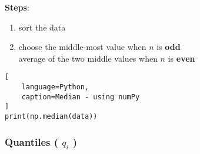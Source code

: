 \vspace{0.3cm}
\textbf{Steps}: \hfill \cite{statistics/book/Statistics-for-Data-Scientists/Maurits-Kaptein}
\begin{enumerate}
    \item sort the data

    \item choose the middle-most value when $n$ is \textbf{odd}\\
        average of the two middle values when $n$ is \textbf{even}
\end{enumerate}


\begin{lstlisting}[
    language=Python, 
    caption=Median - using numPy
]
print(np.median(data))
\end{lstlisting}



\subsubsection{Quantiles ( $q_i$ ) \cite{statistics/book/Statistics-for-Data-Scientists/Maurits-Kaptein}} \label{Data/Describing Data/Central Tendency/Quantiles}

